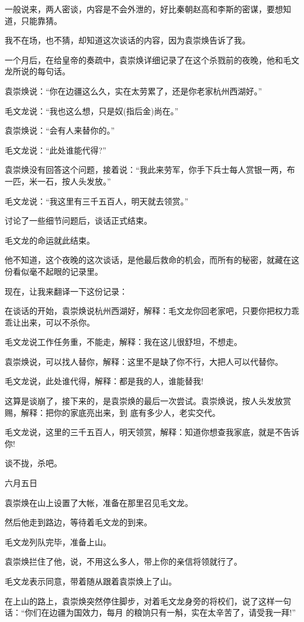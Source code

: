 \documentclass[11pt,a4paper,onecolumn]{article}
\begin{document}
一般说来，两人密谈，内容是不会外泄的，好比秦朝赵高和李斯的密谋，要想知道，只能靠猜。

我不在场，也不猜，却知道这次谈话的内容，因为袁崇焕告诉了我。

一个月后，在给皇帝的奏疏中，袁崇焕详细记录了在这个杀戮前的夜晚，他和毛文龙所说的每句话。

袁崇焕说：``你在边疆这么久，实在太劳累了，还是你老家杭州西湖好。''

毛文龙说：``我也这么想，只是奴(指后金)尚在。''

袁崇焕说：``会有人来替你的。''

毛文龙说：``此处谁能代得?''

袁崇焕没有回答这个问题，接着说：``我此来劳军，你手下兵士每人赏银一两，布一匹，米一石，按人头发放。''

毛文龙说：``我这里有三千五百人，明天就去领赏。''

讨论了一些细节问题后，谈话正式结束。

毛文龙的命运就此结束。

他不知道，这个夜晚的这次谈话，是他最后救命的机会，而所有的秘密，就藏在这份看似毫不起眼的记录里。

现在，让我来翻译一下这份记录：

在谈话的开始，袁崇焕说杭州西湖好，解释：毛文龙你回老家吧，只要你把权力乖乖让出来，可以不杀你。

毛文龙说工作任务重，不能走，解释：我在这儿很舒坦，不想走。

袁崇焕说，可以找人替你，解释：这里不是缺了你不行，大把人可以代替你。

毛文龙说，此处谁代得，解释：都是我的人，谁能替我!

这算是谈崩了，接下来的，是袁崇焕的最后一次尝试。袁崇焕说，按人头发放赏赐，解释：把你的家底亮出来，到
底有多少人，老实交代。

毛文龙说，这里的三千五百人，明天领赏，解释：知道你想查我家底，就是不告诉你!

谈不拢，杀吧。

六月五日

袁崇焕在山上设置了大帐，准备在那里召见毛文龙。

然后他走到路边，等待着毛文龙的到来。

毛文龙列队完毕，准备上山。

袁崇焕拦住了他，说，不用这么多人，带上你的亲信将领就行了。

毛文龙表示同意，带着随从跟着袁崇焕上了山。

在上山的路上，袁崇焕突然停住脚步，对着毛文龙身旁的将校们，说了这样一句话：``你们在边疆为国效力，每月
的粮饷只有一斛，实在太辛苦了，请受我一拜!''
\end{document}
